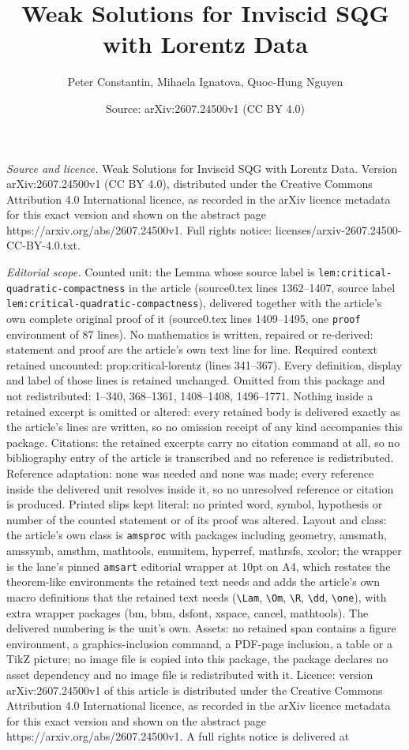 \documentclass[10pt,a4paper]{amsart}
\title[Weak Solutions for Inviscid SQG with Lorentz Data]{Weak Solutions for Inviscid SQG with Lorentz Data}
\author{Peter Constantin, Mihaela Ignatova, Quoc-Hung Nguyen}
\date{Source: arXiv:2607.24500v1 (CC BY 4.0)}
\begin{document}
\maketitle

\noindent\emph{Source and licence.} Weak Solutions for Inviscid SQG with Lorentz Data. Version arXiv:2607.24500v1 (CC BY 4.0), distributed under the Creative Commons Attribution 4.0 International licence, as recorded in the arXiv licence metadata for this exact version and shown on the abstract page https://arxiv.org/abs/2607.24500v1. Full rights notice: licenses/arxiv-2607.24500-CC-BY-4.0.txt.\par\smallskip

\noindent\textit{Editorial scope.} Counted unit: the Lemma whose source label is \texttt{lem:critical-quadratic-compactness} in the article (source0.tex lines 1362--1407, source label \texttt{lem:critical-quadratic-compactness}), delivered together with the article's own complete original proof of it (source0.tex lines 1409--1495, one \texttt{proof} environment of 87 lines). No mathematics is written, repaired or re-derived: statement and proof are the article's own text line for line. Required context retained uncounted: prop:critical-lorentz (lines 341--367). Every definition, display and label of those lines is retained unchanged. Omitted from this package and not redistributed: 1--340, 368--1361, 1408--1408, 1496--1771. Nothing inside a retained excerpt is omitted or altered: every retained body is delivered exactly as the article's lines are written, so no omission receipt of any kind accompanies this package. Citations: the retained excerpts carry no citation command at all, so no bibliography entry of the article is transcribed and no reference is redistributed. Reference adaptation: none was needed and none was made; every reference inside the delivered unit resolves inside it, so no unresolved reference or citation is produced. Printed slips kept literal: no printed word, symbol, hypothesis or number of the counted statement or of its proof was altered. Layout and class: the article's own class is \texttt{amsproc} with packages including geometry, amsmath, amssymb, amsthm, mathtools, enumitem, hyperref, mathrsfs, xcolor; the wrapper is the lane's pinned \texttt{amsart} editorial wrapper at 10pt on A4, which restates the theorem-like environments the retained text needs and adds the article's own macro definitions that the retained text needs (\texttt{\textbackslash Lam}, \texttt{\textbackslash Om}, \texttt{\textbackslash R}, \texttt{\textbackslash dd}, \texttt{\textbackslash one}), with extra wrapper packages (bm, bbm, dsfont, xspace, cancel, mathtools). The delivered numbering is the unit's own. Assets: no retained span contains a figure environment, a graphics-inclusion command, a PDF-page inclusion, a table or a TikZ picture; no image file is copied into this package, the package declares no asset dependency and no image file is redistributed with it. Licence: version arXiv:2607.24500v1 of this article is distributed under the Creative Commons Attribution 4.0 International licence, as recorded in the arXiv licence metadata for this exact version and shown on the abstract page https://arxiv.org/abs/2607.24500v1. A full rights notice is delivered at 
\end{document}
